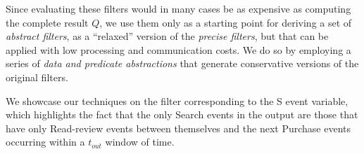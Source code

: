 Since evaluating these filters would in many cases be as expensive as computing
the complete result $Q$, we use them only as a starting point for deriving a set
of {\em abstract filters}, as a ``relaxed'' version of the 
{\em precise filters}, but that can be applied with low processing and 
communication costs.
We do so by employing a series of {\em data and predicate abstractions} 
that generate conservative versions of the original filters.



\newcommand{\NotExistsP}{\ident{NotExistsP}}
\newcommand{\PrecedesP}{\precs{S}}
\newcommand{\PrecedesPP}{\omega_S}
\newcommand{\PrecedesPPP}{\psi_S}
\newcommand{\PrecedesPPPP}{\upsilon_S}


\newcommand{\interval}[1]{\lfloor #1 \rceil}
\newcommand{\uinterval}[1]{\lceil #1 \rfloor}
\newcommand{\hashid}[1]{\# #1}

We showcase our techniques on the filter corresponding to the S event variable,
which highlights the fact that the only Search events in the output are those  
that have only Read-review events between themselves and the next Purchase 
events occurring within a $t_{out}$ window of time.

